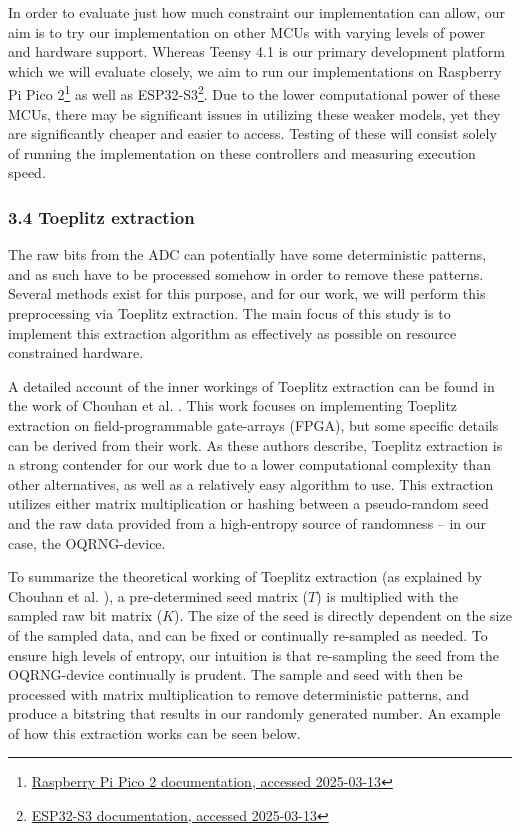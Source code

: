 In order to evaluate just how much constraint our implementation can allow, our aim is to try our implementation on other MCUs with varying levels of power and hardware support. Whereas Teensy 4.1 is our primary development platform which we will evaluate closely, we aim to run our implementations on Raspberry Pi Pico 2\footnote{\href{https://datasheets.raspberrypi.com/pico/pico-2-product-brief.pdf}{Raspberry Pi Pico 2 documentation, accessed 2025-03-13}} as well as ESP32-S3\footnote{\href{https://www.espressif.com/sites/default/files/documentation/esp32-s3_datasheet_en.pdf}{ESP32-S3 documentation, accessed 2025-03-13}}. Due to the lower computational power of these MCUs, there may be significant issues in utilizing these weaker models, yet they are significantly cheaper and easier to access. Testing of these will consist solely of running the implementation on these controllers and measuring execution speed.

\hypertarget{toeplitz-extraction}{%
\subsubsection{\texorpdfstring{3.4 Toeplitz extraction }{3.4 Toeplitz extraction }}\label{toeplitz-extraction}}

The raw bits from the ADC can potentially have some deterministic patterns, and as such have to be processed somehow in order to remove these patterns. Several methods exist for this purpose, and for our work, we will perform this preprocessing via Toeplitz extraction. The main focus of this study is to implement this extraction algorithm as effectively as possible on resource constrained hardware.

A detailed account of the inner workings of Toeplitz extraction can be found in the work of Chouhan et al. \cite{toeplitz-desc}. This work focuses on implementing Toeplitz extraction on field-programmable gate-arrays (FPGA), but some specific details can be derived from their work. As these authors describe, Toeplitz extraction is a strong contender for our work due to a lower computational complexity than other alternatives, as well as a relatively easy algorithm to use. This extraction utilizes either matrix multiplication or hashing between a pseudo-random seed and the raw data provided from a high-entropy source of randomness -- in our case, the OQRNG-device.

To summarize the theoretical working of Toeplitz extraction (as explained by Chouhan et al. \cite{toeplitz-desc}), a pre-determined seed matrix (\(T\)) is multiplied with the sampled raw bit matrix (\(K\)). The size of the seed is directly dependent on the size of the sampled data, and can be fixed or continually re-sampled as needed. To ensure high levels of entropy, our intuition is that re-sampling the seed from the OQRNG-device continually is prudent. The sample and seed with then be processed with matrix multiplication to remove deterministic patterns, and produce a bitstring that results in our randomly generated number. An example of how this extraction works can be seen below.

